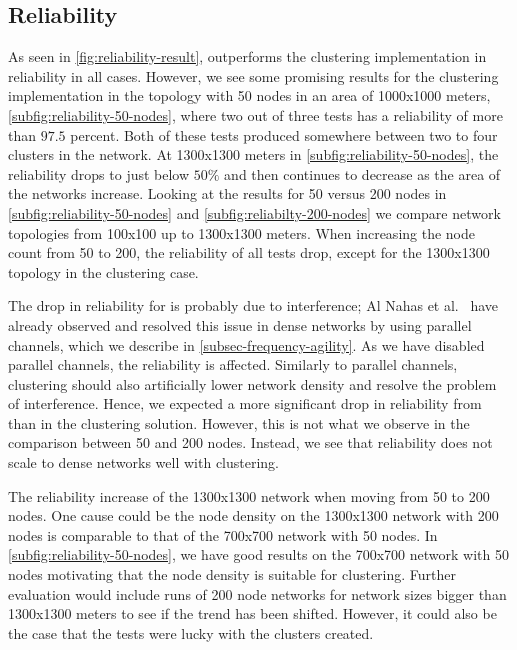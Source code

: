 \subsection{Reliability}
\label{subsec:evaluation-reliability}
As seen in \cref{fig:reliability-result}, \atwo{} outperforms the clustering implementation in reliability in all cases. However, we see some promising results for the clustering implementation in the topology with 50 nodes in an area of 1000x1000 meters, \cref{subfig:reliability-50-nodes}, where two out of three tests has a reliability of more than $97.5$ percent. Both of these tests produced somewhere between two to four clusters in the network. At 1300x1300 meters in \cref{subfig:reliability-50-nodes}, the reliability drops to just below $50\%$ and then continues to decrease as the area of the networks increase. Looking at the results for 50 versus 200 nodes in \cref{subfig:reliability-50-nodes} and \cref{subfig:reliabilty-200-nodes} we compare network topologies from 100x100 up to 1300x1300 meters. When increasing the node count from 50 to 200, the reliability of all tests drop, except for the 1300x1300 topology in the clustering case.


The drop in reliability for \atwo{} is probably due to interference; Al Nahas et al.~\cite{a2-introduction-paper} have already observed and resolved this issue in dense networks by using parallel channels, which we describe in \cref{subsec-frequency-agility}. As we have disabled parallel channels, the reliability is affected. Similarly to parallel channels, clustering should also artificially lower network density and resolve the problem of interference. Hence, we expected a more significant drop in reliability from \atwo{} than in the clustering solution. However, this is not what we observe in the comparison between 50 and 200 nodes. Instead, we see that reliability does not scale to dense networks well with clustering. 

The reliability increase of the 1300x1300 network when moving from 50 to 200 nodes. One cause could be the node density on the 1300x1300 network with 200 nodes is comparable to that of the 700x700 network with 50 nodes. In \cref{subfig:reliability-50-nodes}, we have good results on the 700x700 network with 50 nodes motivating that the node density is suitable for clustering. Further evaluation would include runs of 200 node networks for network sizes bigger than 1300x1300 meters to see if the trend has been shifted. However, it could also be the case that the tests were lucky with the clusters created.

